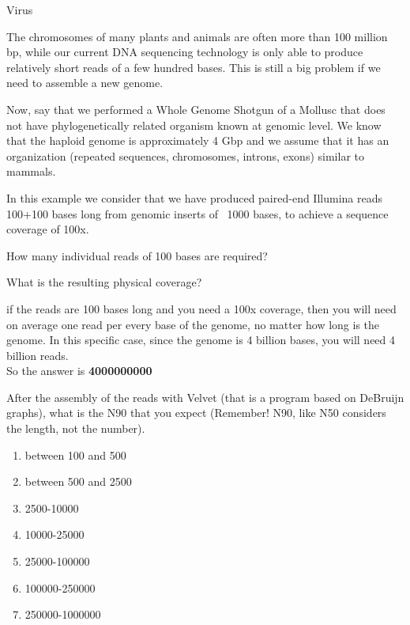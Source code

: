 \begin{Answer} [
  ref={ex35},
  number={1}
 ]

\Question Virus



\end{Answer}

\begin{Exercise} [
  label={ex36},
  origin={G. Valle}
 ]

The chromosomes of many plants and animals are often more than 100
million bp, while our current DNA sequencing technology is only able to produce
relatively short reads of a few hundred bases. This is still a big problem if
we need to assemble a new genome.

Now, say that we performed a Whole Genome Shotgun of a Mollusc that does not
have phylogenetically related organism known at genomic level. We know that the
haploid genome is approximately 4 Gbp and we assume that it has an organization
(repeated sequences, chromosomes, introns, exons) similar to mammals.

In this example we consider that we have produced paired-end Illumina reads
100+100 bases long from genomic inserts of ~1000 bases, to achieve a sequence
coverage of 100x.

\Question How many individual reads of 100 bases are required?

\Question What is the resulting physical coverage?
\end{Exercise}

\begin{Answer} [
  ref={ex36},
  number={1}
 ]

\Question if the reads are 100 bases long and you need a 100x coverage, then
you will need on average one read per every base of the genome, no matter how
long is the genome. In this specific case, since the genome is 4 billion bases,
you will need 4 billion reads.\\
So the answer is \textbf{4000000000}
\end{Answer}

\begin{Exercise} [
  label={ex37},
  origin={G. Valle}
 ]

\Question After the assembly of the reads with Velvet (that is a program based
on DeBruijn graphs), what is the N90 that you expect (Remember!  N90, like N50
considers the length, not the number).
\begin{enumerate}
\item between 100 and 500
\item between 500 and 2500
\item 2500-10000
\item 10000-25000
\item 25000-100000
\item 100000-250000
\item 250000-1000000 
\end{enumerate}


\end{Exercise}

